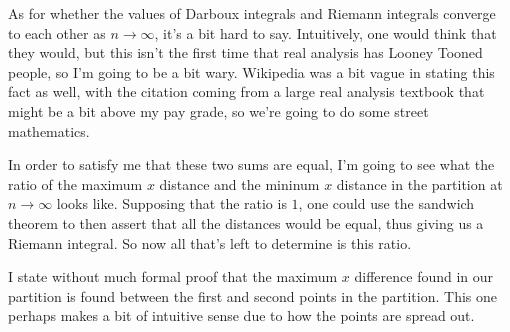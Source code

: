 \documentclass{article}
\begin{document}
As for whether the values of Darboux integrals and Riemann integrals converge
to each other as \( n \to \infty \), it's a bit hard to say. Intuitively, one
would think that they would, but this isn't the first time that real analysis
has Looney Tooned people, so I'm going to be a bit wary. Wikipedia was a bit
vague in stating this fact as well, with the citation coming from a large real
analysis textbook that might be a bit above my pay grade, so we're going to do
some street mathematics.

In order to satisfy me that these two sums are equal, I'm going to see what the
ratio of the maximum \( x \) distance and the mininum \( x \) distance in the
partition at \( n \to \infty \) looks like. Supposing that the ratio is \( 1
\), one could use the sandwich theorem to then assert that all the distances
would be equal, thus giving us a Riemann integral. So now all that's left to
determine is this ratio.

I state without much formal proof that the maximum \( x \) difference found in
our partition is found between the first and second points in the partition.
This one perhaps makes a bit of intuitive sense due to how the points are
spread out.
\end{document}
